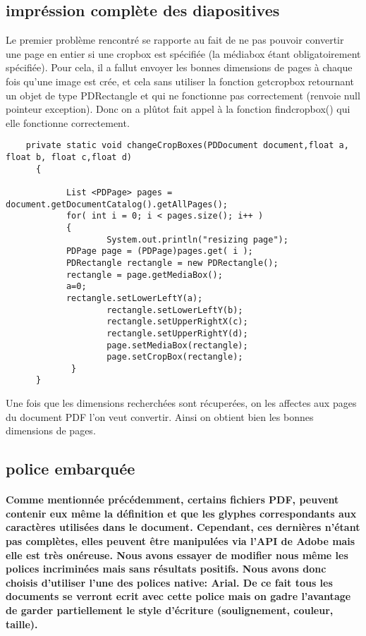 	\subsection{impréssion complète des diapositives}
		 Le premier problème rencontré se rapporte au fait de ne pas pouvoir convertir une page en entier si une cropbox est spécifiée (la médiabox étant obligatoirement spécifiée). Pour cela, il a fallut envoyer les bonnes dimensions de pages à chaque fois qu'une image est crée, et cela sans utiliser la fonction
		 getcropbox retournant un objet de type PDRectangle et qui ne fonctionne pas correctement (renvoie null pointeur exception). Donc on a plûtot fait appel à la fonction findcropbox() qui elle fonctionne correctement.
	\begin{lstlisting} 
	private static void changeCropBoxes(PDDocument document,float a, float b, float c,float d)
  	  {

      		List <PDPage> pages = document.getDocumentCatalog().getAllPages();
      		for( int i = 0; i < pages.size(); i++ )
      		{
          			System.out.println("resizing page");
	  		PDPage page = (PDPage)pages.get( i );
	  		PDRectangle rectangle = new PDRectangle();
	   		rectangle = page.getMediaBox();
	   		a=0;
	   		rectangle.setLowerLeftY(a);
             		rectangle.setLowerLeftY(b);
              		rectangle.setUpperRightX(c);
             		rectangle.setUpperRightY(d);
             		page.setMediaBox(rectangle);
             		page.setCropBox(rectangle);
     		 }
  	  }
 \end{lstlisting}

	Une fois que les dimensions recherchées sont récuperées, on les affectes aux pages du document PDF l'on veut convertir. Ainsi on obtient bien les bonnes dimensions de pages.
		\subsection{police embarquée}
	\paragraph{
	Comme mentionnée précédemment, certains fichiers PDF, peuvent contenir eux même la définition et que les glyphes correspondants aux caractères utilisées dans le document. \newline Cependant, ces dernières n'étant pas complètes, elles peuvent être manipulées via l'API de Adobe mais elle est très onéreuse. 				Nous avons essayer de modifier nous même les polices incriminées mais sans résultats positifs. Nous avons donc choisis d'utiliser l'une des polices native: Arial. \newline
	De ce fait tous les documents  se verront ecrit avec cette police mais on gadre l'avantage de garder partiellement le style d'écriture (soulignement, couleur, taille).
	}








